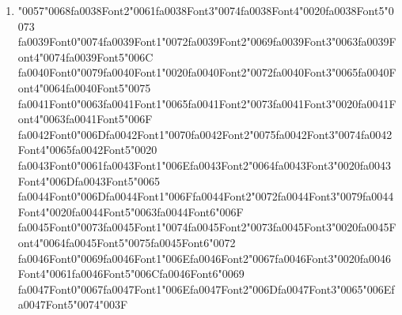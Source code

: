 \documentclass[12pt]{article}
\begin{document}
\begin{enumerate}[label=Q\arabic*.]
\item {\char"0057}{\char"0068}{\csname fa0038Font2\endcsname\char"0061}{\csname fa0038Font3\endcsname\char"0074}{\csname fa0038Font4\endcsname\char"0020}{\csname fa0038Font5\endcsname\char"0073} {\csname fa0039Font0\endcsname\char"0074}{\csname fa0039Font1\endcsname\char"0072}{\csname fa0039Font2\endcsname\char"0069}{\csname fa0039Font3\endcsname\char"0063}{\csname fa0039Font4\endcsname\char"0074}{\csname fa0039Font5\endcsname\char"006C} {\csname fa0040Font0\endcsname\char"0079}{\csname fa0040Font1\endcsname\char"0020}{\csname fa0040Font2\endcsname\char"0072}{\csname fa0040Font3\endcsname\char"0065}{\csname fa0040Font4\endcsname\char"0064}{\csname fa0040Font5\endcsname\char"0075} {\csname fa0041Font0\endcsname\char"0063}{\csname fa0041Font1\endcsname\char"0065}{\csname fa0041Font2\endcsname\char"0073}{\csname fa0041Font3\endcsname\char"0020}{\csname fa0041Font4\endcsname\char"0063}{\csname fa0041Font5\endcsname\char"006F} {\csname fa0042Font0\endcsname\char"006D}{\csname fa0042Font1\endcsname\char"0070}{\csname fa0042Font2\endcsname\char"0075}{\csname fa0042Font3\endcsname\char"0074}{\csname fa0042Font4\endcsname\char"0065}{\csname fa0042Font5\endcsname\char"0020} {\csname fa0043Font0\endcsname\char"0061}{\csname fa0043Font1\endcsname\char"006E}{\csname fa0043Font2\endcsname\char"0064}{\csname fa0043Font3\endcsname\char"0020}{\csname fa0043Font4\endcsname\char"006D}{\csname fa0043Font5\endcsname\char"0065} {\csname fa0044Font0\endcsname\char"006D}{\csname fa0044Font1\endcsname\char"006F}{\csname fa0044Font2\endcsname\char"0072}{\csname fa0044Font3\endcsname\char"0079}{\csname fa0044Font4\endcsname\char"0020}{\csname fa0044Font5\endcsname\char"0063}{\csname fa0044Font6\endcsname\char"006F} {\csname fa0045Font0\endcsname\char"0073}{\csname fa0045Font1\endcsname\char"0074}{\csname fa0045Font2\endcsname\char"0073}{\csname fa0045Font3\endcsname\char"0020}{\csname fa0045Font4\endcsname\char"0064}{\csname fa0045Font5\endcsname\char"0075}{\csname fa0045Font6\endcsname\char"0072} {\csname fa0046Font0\endcsname\char"0069}{\csname fa0046Font1\endcsname\char"006E}{\csname fa0046Font2\endcsname\char"0067}{\csname fa0046Font3\endcsname\char"0020}{\csname fa0046Font4\endcsname\char"0061}{\csname fa0046Font5\endcsname\char"006C}{\csname fa0046Font6\endcsname\char"0069} {\csname fa0047Font0\endcsname\char"0067}{\csname fa0047Font1\endcsname\char"006E}{\csname fa0047Font2\endcsname\char"006D}{\csname fa0047Font3\endcsname\char"0065}{\char"006E}{\csname fa0047Font5\endcsname\char"0074}{\char"003F}
\begin{enumerate}[label=(\Alph*)]

\end{enumerate}
\end{enumerate}
\end{document}
